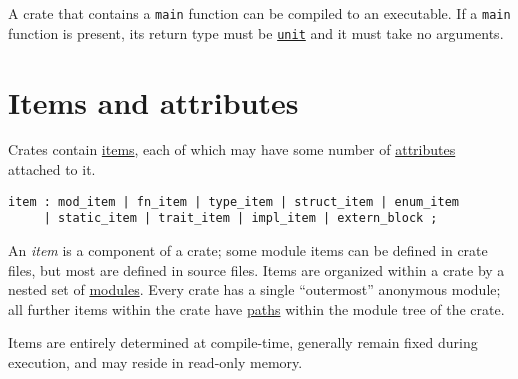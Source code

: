 \documentclass[]{article}
\newenvironment{Shaded}{}{}
\newcommand{\StringTok}[1]{\textcolor[rgb]{0.25,0.44,0.63}{{#1}}}
\newcommand{\CommentTok}[1]{\textcolor[rgb]{0.38,0.63,0.69}{\textit{{#1}}}}
\newcommand{\NormalTok}[1]{{#1}}
\begin{document}
\begin{Shaded}
\end{Shaded}

A crate that contains a \texttt{main} function can be compiled to an
executable. If a \texttt{main} function is present, its return type must
be \hyperref[primitive-types]{\texttt{unit}} and it must take no
arguments.

\section{Items and attributes}\label{items-and-attributes}

Crates contain \hyperref[items]{items}, each of which may have some
number of \hyperref[attributes]{attributes} attached to it.


\begin{verbatim}
item : mod_item | fn_item | type_item | struct_item | enum_item
     | static_item | trait_item | impl_item | extern_block ;
\end{verbatim}

An \emph{item} is a component of a crate; some module items can be
defined in crate files, but most are defined in source files. Items are
organized within a crate by a nested set of \hyperref[modules]{modules}.
Every crate has a single ``outermost'' anonymous module; all further
items within the crate have \hyperref[paths]{paths} within the module
tree of the crate.

Items are entirely determined at compile-time, generally remain fixed
during execution, and may reside in read-only memory.
\end{document}
